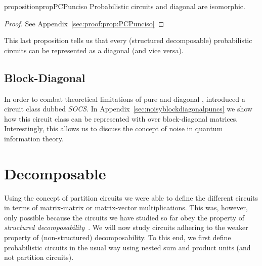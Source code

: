 \begin{restatable}{proposition}{propPCPunciso}
	\label{prop:PCPunciso}
	Probabilistic circuits and diagonal \puncs are isomorphic.
\end{restatable}



\begin{proof}
	See Appendix~\ref{sec:proof:prop:PCPunciso}
\end{proof}

This last proposition tells us that every (structured decomposable) probabilistic circuits can be represented as a diagonal \punc (and vice versa).



\subsection{Block-Diagonal \puncs}

In order to combat theoretical limitations of pure and diagonal \puncs, \citet{loconte2025sum} introduced a circuit class dubbed \textit{\textmu SOCS}. In Appendix~\ref{sec:noisyblockdiagonalpuncs} we show how this circuit class can be represented with \puncs over block-diagonal matrices. Interestingly, this allows us to discuss the concept of noise in quantum information theory.






\section{Decomposable \puncs}
\label{sec:nsdnmcircuit}

Using the concept of partition circuits we were able to define the different circuits in terms of matrix-matrix or matrix-vector multiplications. This was, however, only possible because the circuits we have studied so far obey the property of \textit{structured decomposability}~\citep{pipatsrisawat2008new,darwiche2011sdd}.
We will now study circuits adhering to the weaker property of (non-structured) decomposability. To this end, we first define probabilistic circuits in the usual way using nested sum and product units \citep{vergari2021compositional} (and not partition circuits).

